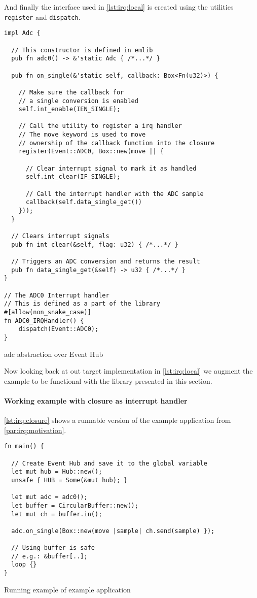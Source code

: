 And finally the interface used in \autoref{lst:irq:local} is created using the utilities \texttt{register} and \texttt{dispatch}.
\begin{listing}[H]
  \begin{verbatim}
impl Adc {

  // This constructor is defined in emlib
  pub fn adc0() -> &'static Adc { /*...*/ }

  pub fn on_single(&'static self, callback: Box<Fn(u32)>) {

    // Make sure the callback for
    // a single conversion is enabled
    self.int_enable(IEN_SINGLE);

    // Call the utility to register a irq handler
    // The move keyword is used to move
    // ownership of the callback function into the closure
    register(Event::ADC0, Box::new(move || {

      // Clear interrupt signal to mark it as handled
      self.int_clear(IF_SINGLE);

      // Call the interrupt handler with the ADC sample
      callback(self.data_single_get())
    }));
  }

  // Clears interrupt signals
  pub fn int_clear(&self, flag: u32) { /*...*/ }

  // Triggers an ADC conversion and returns the result
  pub fn data_single_get(&self) -> u32 { /*...*/ }
}

// The ADC0 Interrupt handler
// This is defined as a part of the library
#[allow(non_snake_case)]
fn ADC0_IRQHandler() {
    dispatch(Event::ADC0);
}
  \end{verbatim}
  \caption{\gls{adc} abstraction over Event Hub}
  \label{lst:adc-abstraction}
\end{listing}

Now looking back at out target implementation in \autoref{lst:irq:local} we augment the example to be functional with the library presented in this section.

\paragraph{Working example with closure as interrupt handler}

\autoref{lst:irq:closure} shows a runnable version of the example application from \autoref{par:irq:motivation}.

\begin{listing}[H]
  \begin{verbatim}
fn main() {

  // Create Event Hub and save it to the global variable
  let mut hub = Hub::new();
  unsafe { HUB = Some(&mut hub); }

  let mut adc = adc0();
  let buffer = CircularBuffer::new();
  let mut ch = buffer.in();

  adc.on_single(Box::new(move |sample| ch.send(sample) });

  // Using buffer is safe
  // e.g.: &buffer[..];
  loop {}
}
  \end{verbatim}
  \caption{Running example of example application}
  \label{lst:irq:closure}
\end{listing}

